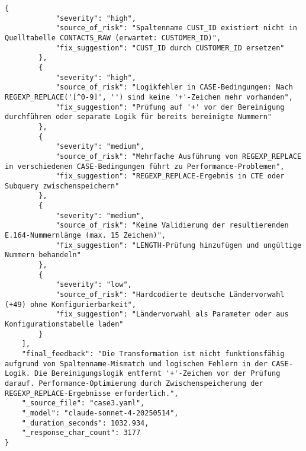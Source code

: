 \begin{lstlisting}[caption={Ausgabe: Claude Sonnet 4 Anwendungsfall 3 Hauptdurchlauf},label={claude_case3_prompt1}]
        {
            "severity": "high",
            "source_of_risk": "Spaltenname CUST_ID existiert nicht in Quelltabelle CONTACTS_RAW (erwartet: CUSTOMER_ID)",
            "fix_suggestion": "CUST_ID durch CUSTOMER_ID ersetzen"
        },
        {
            "severity": "high",
            "source_of_risk": "Logikfehler in CASE-Bedingungen: Nach REGEXP_REPLACE('[^0-9]', '') sind keine '+'-Zeichen mehr vorhanden",
            "fix_suggestion": "Prüfung auf '+' vor der Bereinigung durchführen oder separate Logik für bereits bereinigte Nummern"
        },
        {
            "severity": "medium",
            "source_of_risk": "Mehrfache Ausführung von REGEXP_REPLACE in verschiedenen CASE-Bedingungen führt zu Performance-Problemen",
            "fix_suggestion": "REGEXP_REPLACE-Ergebnis in CTE oder Subquery zwischenspeichern"
        },
        {
            "severity": "medium",
            "source_of_risk": "Keine Validierung der resultierenden E.164-Nummernlänge (max. 15 Zeichen)",
            "fix_suggestion": "LENGTH-Prüfung hinzufügen und ungültige Nummern behandeln"
        },
        {
            "severity": "low",
            "source_of_risk": "Hardcodierte deutsche Ländervorwahl (+49) ohne Konfigurierbarkeit",
            "fix_suggestion": "Ländervorwahl als Parameter oder aus Konfigurationstabelle laden"
        }
    ],
    "final_feedback": "Die Transformation ist nicht funktionsfähig aufgrund von Spaltenname-Mismatch und logischen Fehlern in der CASE-Logik. Die Bereinigungslogik entfernt '+'-Zeichen vor der Prüfung darauf. Performance-Optimierung durch Zwischenspeicherung der REGEXP_REPLACE-Ergebnisse erforderlich.",
    "_source_file": "case3.yaml",
    "_model": "claude-sonnet-4-20250514",
    "_duration_seconds": 1032.934,
    "_response_char_count": 3177
}
\end{lstlisting}

